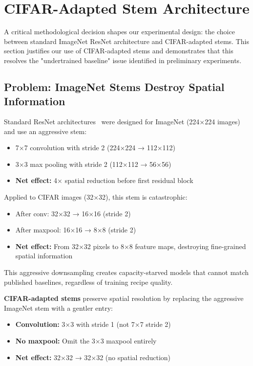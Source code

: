 
\section{CIFAR-Adapted Stem Architecture}
\label{sec:architecture_choice}

A critical methodological decision shapes our experimental design: the choice between standard ImageNet ResNet architecture and CIFAR-adapted stems. This section justifies our use of CIFAR-adapted stems and demonstrates that this resolves the "undertrained baseline" issue identified in preliminary experiments.

\subsection{Problem: ImageNet Stems Destroy Spatial Information}

Standard ResNet architectures~\cite{he2016resnet} were designed for ImageNet (224×224 images) and use an aggressive stem:
\begin{itemize}
    \item 7×7 convolution with stride 2 (224×224 → 112×112)
    \item 3×3 max pooling with stride 2 (112×112 → 56×56)
    \item \textbf{Net effect:} 4× spatial reduction before first residual block
\end{itemize}

Applied to CIFAR images (32×32), this stem is catastrophic:
\begin{itemize}
    \item After conv: 32×32 → 16×16 (stride 2)
    \item After maxpool: 16×16 → 8×8 (stride 2)
    \item \textbf{Net effect:} From 32×32 pixels to 8×8 feature maps, destroying fine-grained spatial information
\end{itemize}

This aggressive downsampling creates capacity-starved models that cannot match published baselines, regardless of training recipe quality.

\textbf{CIFAR-adapted stems} preserve spatial resolution by replacing the aggressive ImageNet stem with a gentler entry:
\begin{itemize}
    \item \textbf{Convolution:} 3×3 with stride 1 (not 7×7 stride 2)
    \item \textbf{No maxpool:} Omit the 3×3 maxpool entirely
    \item \textbf{Net effect:} 32×32 → 32×32 (no spatial reduction)
\end{itemize}

